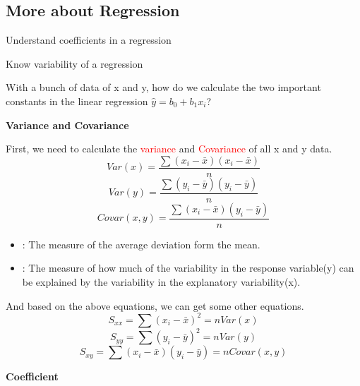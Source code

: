 \subsection{More about Regression}
\begin{objectives}
    \item Understand coefficients in a regression
    \item Know variability of a regression    
\end{objectives}
\vbox{}
With a bunch of data of x and y, how do we calculate the two important constants in the linear regression \(\hat{y}=b_0+b_1x_i\)?
 \vspace{6ex}
\begin{Center}
    \textbf{Variance and Covariance}
\end{Center}
    First, we need to calculate the \textcolor{red}{variance} and \textcolor{red}{Covariance} of all x and y data.
    \begin{equation}
        Var(x)=\frac{\sum{(x_i-\bar{x})(x_i-\bar{x})}}{n}    
    \end{equation}
    \begin{equation}
        Var(y)=\frac{\sum{(y_i-\bar{y})(y_i-\bar{y})}}{n}
    \end{equation}
    \begin{equation}
        Covar(x,y)=\frac{\sum{(x_i-\bar{x})(y_i-\bar{y})}}{n}
    \end{equation}
\begin{itemize}
    \item {}: The measure of the average deviation form the mean.
    \item {}: The measure of how much of the variability in the response variable(y) can be explained by the variability in the explanatory variability(x).
\end{itemize}
And based on the above equations, we can get some other equations.
\begin{equation}
    S_{xx}=\sum{(x_i-\bar{x})^2}=nVar(x)
\end{equation}
\begin{equation}
    S_{yy}=\sum{(y_i-\bar{y})^2}=nVar(y)    
\end{equation}
\begin{equation}
    S_{xy}=\sum{(x_i-\bar{x})(y_i-\bar{y})}=nCovar(x,y)
\end{equation}
 \vspace{6ex}
\begin{Center}
    \textbf{Coefficient}
\end{Center}
